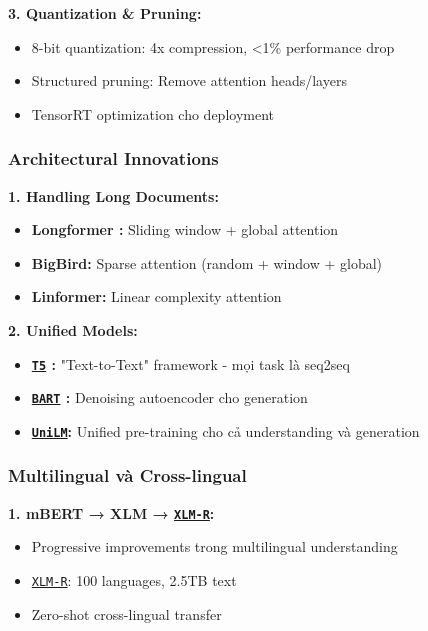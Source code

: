 \textbf{3. Quantization \& Pruning:}
\begin{itemize}
    \item 8-bit quantization: 4x compression, <1\% performance drop
    \item Structured pruning: Remove attention heads/layers
    \item TensorRT optimization cho deployment
\end{itemize}

\subsubsection{Architectural Innovations}

\textbf{1. Handling Long Documents:}
\begin{itemize}
    \item \textbf{Longformer \cite{beltagy2020longformer}:} Sliding window + global attention
    \item \textbf{BigBird:} Sparse attention (random + window + global)
    \item \textbf{Linformer:} Linear complexity attention
\end{itemize}

\textbf{2. Unified Models:}
\begin{itemize}
    \item \textbf{\hyperref[acro:t5]{\texttt{T5}} \cite{raffel2020exploring}:} "Text-to-Text" framework - mọi task là seq2seq
    \item \textbf{\hyperref[acro:bart]{\texttt{BART}} \cite{lewis2019bart}:} Denoising autoencoder cho generation
    \item \textbf{\hyperref[acro:unilm]{\texttt{UniLM}}:} Unified pre-training cho cả understanding và generation
\end{itemize}

\subsubsection{Multilingual và Cross-lingual}

\textbf{1. mBERT → XLM \cite{conneau2019unsupervised} → \hyperref[acro:xlm-r]{\texttt{XLM-R}}:}
\begin{itemize}
    \item Progressive improvements trong multilingual understanding
    \item \hyperref[acro:xlm-r]{\texttt{XLM-R}}: 100 languages, 2.5TB text
    \item Zero-shot cross-lingual transfer
\end{itemize}

